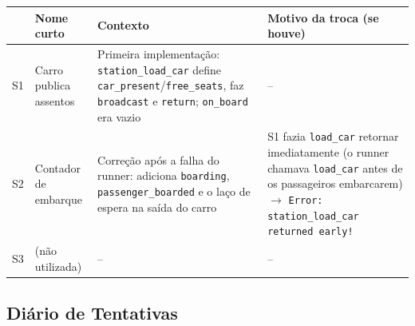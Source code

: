 \documentclass[11pt,a4paper]{article}
\begin{document}
\noindent\begin{tabularx}{\textwidth}{c L{3.4cm} Y Y}
\toprule
 & \textbf{Nome curto} & \textbf{Contexto} & \textbf{Motivo da troca (se houve)} \\
\midrule
S1 & Carro publica assentos &
Primeira implementação: \texttt{station\_load\_car} define
\texttt{car\_present}/\texttt{free\_seats}, faz \texttt{broadcast} e \texttt{return}; \texttt{on\_board} era vazio &
-- \\
S2 & Contador de embarque &
Correção após a falha do runner: adiciona \texttt{boarding},
\texttt{passenger\_boarded} e o laço de espera na saída do carro &
S1 fazia \texttt{load\_car} retornar imediatamente (o runner chamava
\texttt{load\_car} antes de os passageiros embarcarem) $\rightarrow$
\texttt{Error: station\_load\_car returned early!} \\
S3 & (não utilizada) & -- & -- \\
\bottomrule
\end{tabularx}

\subsection{Diário de Tentativas}
\end{document}
